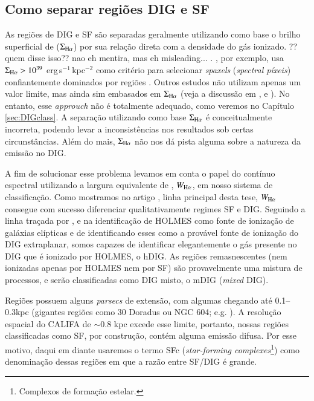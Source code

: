 \subsection{Como separar regiões DIG e SF}
\label{sec:intro:DIG:class}
As regiões de DIG e SF são separadas geralmente utilizando como base o brilho superficial de \Ha ($\Sigma_{\Ha}$)
{\ATR por sua relação direta com a densidade do gás ionizado. \ATM?? quem disse isso?? nao eh mentira, mas eh misleading...}
. \citet{Zhang.etal.2017a}, por exemplo, usa $\Sigma_{\Ha} > 10^{39}$ erg$\,$s$^{-1}\,$kpc$^{-2}$ como critério para selecionar {\em spaxels} ({\em spectral píxeis}) confiantemente dominados por regiões \hii. Outros estudos não utilizam apenas um valor limite, mas ainda sim embasados em $\Sigma_{\Ha}$ (veja a discussão em \citealt{Zurita.etal.2000}, \citealt{Oey.etal.2007} e \citealt{Vogt.etal.2017a}). No entanto, esse {\em approuch} não é totalmente adequado, como veremos no Capítulo \ref{sec:DIGclass}. A separação utilizando como base $\Sigma_{\Ha}$ é conceitualmente incorreta, podendo levar a inconsistências nos resultados sob certas circunstâncias. Além do mais, $\Sigma_{\Ha}$ não nos dá pista alguma sobre a natureza da emissão no DIG.

A fim de solucionar esse problema levamos em conta o papel do contínuo espectral utilizando a largura equivalente de \Ha, $W_{\Ha}$, em nosso sistema de classificação. Como mostramos no artigo \citet[][Apêndice \ref{apendice:DIGpaper0}]{Lacerda.etal.2018}, linha principal desta tese, $W_{\Ha}$ consegue com sucesso diferenciar qualitativamente regimes SF e DIG. Seguindo a linha traçada por \citet{Binette.etal.1994a}, \citet{Stasinska.etal.2008a} e \citet{CidFernandes.etal.2011a} na identificação de HOLMES como fonte de ionização de galáxias elípticas e de \citet{FloresFajardo.etal.2011a} identificando esses como a provável fonte de ionização do DIG extraplanar, somos capazes de identificar elegantemente o gás presente no DIG que é ionizado por HOLMES, o hDIG. As regiões remasnescentes (nem ionizadas apenas por HOLMES nem por SF) são provavelmente uma mistura de processos, e serão classificadas como DIG misto, o mDIG ({\em mixed} DIG).

Regiões \hii possuem alguns {\em parsecs} de extensão, com algumas chegando até 0.1--0.3kpc (gigantes regiões como 30 Doradus ou NGC 604; e.g. \citealt{Rosa.y.Enrique.2000}). A resolução espacial do CALIFA de $\sim 0.8$ kpc excede esse limite, portanto, nossas regiões classificadas como SF, por construção, contém alguma emissão difusa.
Por esse motivo, daqui em diante usaremos o termo SFc ({\em star-forming complexes}\footnote{Complexos de formação estelar.}) como denominação dessas regiões em que a razão entre SF/DIG é grande.


